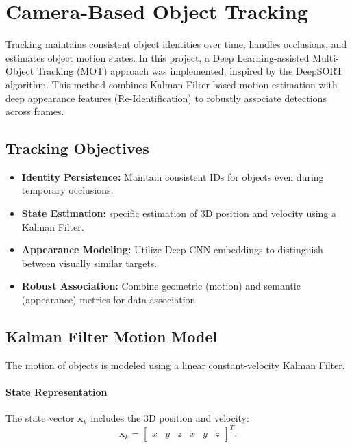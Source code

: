 \documentclass[12pt,a4paper]{report}
\begin{document}
\section{Camera-Based Object Tracking}
Tracking maintains consistent object identities over time, handles occlusions, and estimates object motion states. In this project, a Deep Learning-assisted Multi-Object Tracking (MOT) approach was implemented, inspired by the DeepSORT algorithm. This method combines Kalman Filter-based motion estimation with deep appearance features (Re-Identification) to robustly associate detections across frames.

\subsection{Tracking Objectives}
\begin{itemize}
    \item \textbf{Identity Persistence:} Maintain consistent IDs for objects even during temporary occlusions.
    \item \textbf{State Estimation:} specific estimation of 3D position and velocity using a Kalman Filter.
    \item \textbf{Appearance Modeling:} Utilize Deep CNN embeddings to distinguish between visually similar targets.
    \item \textbf{Robust Association:} Combine geometric (motion) and semantic (appearance) metrics for data association.
\end{itemize}

\subsection{Kalman Filter Motion Model}
The motion of objects is modeled using a linear constant-velocity Kalman Filter.
\paragraph{State Representation}
The state vector $\mathbf{x}_k$ includes the 3D position and velocity:
\begin{equation}
\mathbf{x}_k=
\begin{bmatrix}
x & y & z & \dot{x} & \dot{y} & \dot{z}
\end{bmatrix}^T.
\end{equation}
\end{document}
